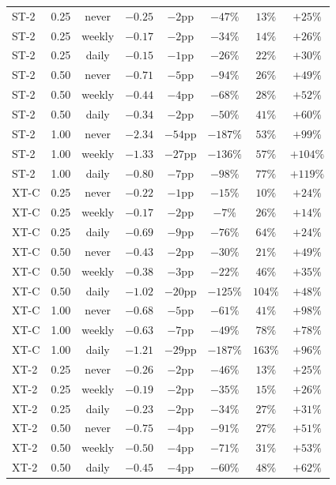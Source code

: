 \documentclass[11pt]{article}
\begin{document}
\begin{table}[h]
\begin{tabular}{llcccccc}
ST-2 & 0.25 & never & $-0.25$ & $-2$pp & $-47\%$ & $13\%$ & $+25\%$ \\
ST-2 & 0.25 & weekly & $-0.17$ & $-2$pp & $-34\%$ & $14\%$ & $+26\%$ \\
ST-2 & 0.25 & daily & $-0.15$ & $-1$pp & $-26\%$ & $22\%$ & $+30\%$ \\
ST-2 & 0.50 & never & $-0.71$ & $-5$pp & $-94\%$ & $26\%$ & $+49\%$ \\
ST-2 & 0.50 & weekly & $-0.44$ & $-4$pp & $-68\%$ & $28\%$ & $+52\%$ \\
ST-2 & 0.50 & daily & $-0.34$ & $-2$pp & $-50\%$ & $41\%$ & $+60\%$ \\
ST-2 & 1.00 & never & $-2.34$ & $-54$pp & $-187\%$ & $53\%$ & $+99\%$ \\
ST-2 & 1.00 & weekly & $-1.33$ & $-27$pp & $-136\%$ & $57\%$ & $+104\%$ \\
ST-2 & 1.00 & daily & $-0.80$ & $-7$pp & $-98\%$ & $77\%$ & $+119\%$ \\
XT-C & 0.25 & never & $-0.22$ & $-1$pp & $-15\%$ & $10\%$ & $+24\%$ \\
XT-C & 0.25 & weekly & $-0.17$ & $-2$pp & $-7\%$ & $26\%$ & $+14\%$ \\
XT-C & 0.25 & daily & $-0.69$ & $-9$pp & $-76\%$ & $64\%$ & $+24\%$ \\
XT-C & 0.50 & never & $-0.43$ & $-2$pp & $-30\%$ & $21\%$ & $+49\%$ \\
XT-C & 0.50 & weekly & $-0.38$ & $-3$pp & $-22\%$ & $46\%$ & $+35\%$ \\
XT-C & 0.50 & daily & $-1.02$ & $-20$pp & $-125\%$ & $104\%$ & $+48\%$ \\
XT-C & 1.00 & never & $-0.68$ & $-5$pp & $-61\%$ & $41\%$ & $+98\%$ \\
XT-C & 1.00 & weekly & $-0.63$ & $-7$pp & $-49\%$ & $78\%$ & $+78\%$ \\
XT-C & 1.00 & daily & $-1.21$ & $-29$pp & $-187\%$ & $163\%$ & $+96\%$ \\
XT-2 & 0.25 & never & $-0.26$ & $-2$pp & $-46\%$ & $13\%$ & $+25\%$ \\
XT-2 & 0.25 & weekly & $-0.19$ & $-2$pp & $-35\%$ & $15\%$ & $+26\%$ \\
XT-2 & 0.25 & daily & $-0.23$ & $-2$pp & $-34\%$ & $27\%$ & $+31\%$ \\
XT-2 & 0.50 & never & $-0.75$ & $-4$pp & $-91\%$ & $27\%$ & $+51\%$ \\
XT-2 & 0.50 & weekly & $-0.50$ & $-4$pp & $-71\%$ & $31\%$ & $+53\%$ \\
XT-2 & 0.50 & daily & $-0.45$ & $-4$pp & $-60\%$ & $48\%$ & $+62\%$ \\

\end{tabular}
\end{table}
\end{document}
